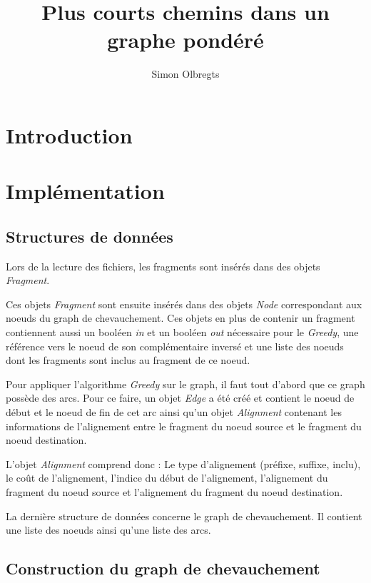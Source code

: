 \documentclass[12pt,a4paper,final]{article}
\author{Simon Olbregts}
\title{Plus courts chemins dans un graphe pondéré}
\begin{document}
\umonsCoverPage
\pagebreak

\pagestyle{fancy}

\thispagestyle{empty}
\newpage
\tableofcontents
\newpage



\section{Introduction}

\section{Implémentation}
\subsection{Structures de données}

Lors de la lecture des fichiers, les fragments sont insérés dans des objets \textit{Fragment}.\medskip

Ces objets \textit{Fragment} sont ensuite insérés dans des objets \textit{Node} correspondant aux noeuds du graph de chevauchement.  Ces objets en plus de contenir un fragment contiennent aussi un booléen \textit{in} et un booléen \textit{out} nécessaire pour le \textit{Greedy}, une référence vers le noeud de son complémentaire inversé et une liste des noeuds dont les fragments sont inclus au fragment de ce noeud.\medskip

Pour appliquer l'algorithme \textit{Greedy} sur le graph, il faut tout d'abord que ce graph possède des arcs.  Pour ce faire, un objet \textit{Edge} a été créé et contient le noeud de début et le noeud de fin de cet arc ainsi qu'un objet \textit{Alignment} contenant les informations de l'alignement entre le fragment du noeud source et le fragment du noeud destination.\medskip

L'objet \textit{Alignment} comprend donc : Le type d'alignement (préfixe, suffixe, inclu), le coût de l'alignement, l'indice du début de l'alignement, l'alignement du fragment du noeud source et l'alignement du fragment du noeud destination.\medskip

La dernière structure de données concerne le graph de chevauchement.  Il contient une liste des noeuds ainsi qu'une liste des arcs.

\subsection{Construction du graph de chevauchement}
\end{document}
